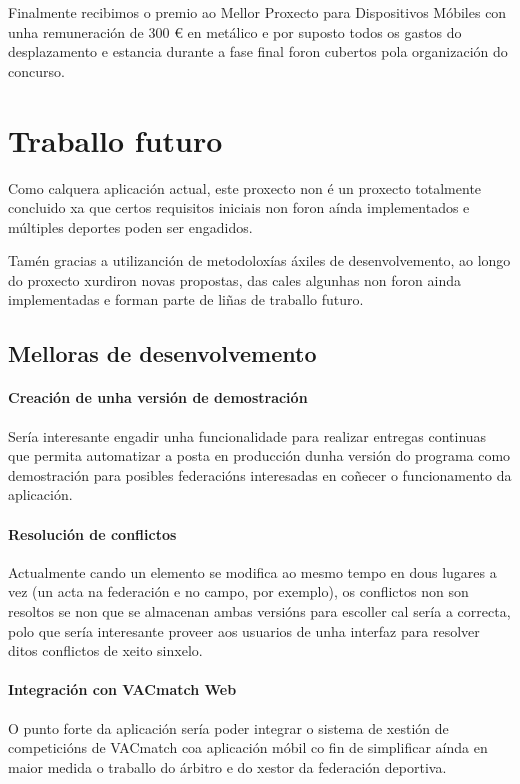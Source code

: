  Finalmente recibimos o premio ao Mellor Proxecto para Dispositivos Móbiles 
con unha remuneración de 300 \euro{} en metálico e por suposto todos os gastos 
do desplazamento e estancia durante a fase final foron cubertos pola 
organización do concurso.

\section{Traballo futuro}
Como calquera aplicación actual, este proxecto non é un proxecto totalmente 
concluido xa que certos requisitos iniciais non foron aínda implementados e 
múltiples deportes poden ser engadidos.

Tamén gracias a utilizanción de metodoloxías áxiles de desenvolvemento, ao 
longo do proxecto xurdiron novas propostas, das cales algunhas non foron 
ainda implementadas e forman parte de liñas de traballo futuro.

  \subsection{Melloras de desenvolvemento}

    \paragraph{Creación de unha versión de demostración} Sería interesante 
engadir unha funcionalidade para realizar entregas continuas que permita 
automatizar a posta en producción dunha versión do programa como demostración 
para posibles federacións interesadas en coñecer o funcionamento da aplicación.

    \paragraph{Resolución de conflictos} Actualmente cando un elemento se 
modifica ao mesmo tempo en dous lugares a vez (un acta na federación e no 
campo, por exemplo), os conflictos non son resoltos se non que se almacenan 
ambas versións para escoller cal sería a correcta, polo que sería interesante 
proveer aos usuarios de unha interfaz para resolver ditos conflictos de xeito 
sinxelo.

    \paragraph{Integración con VACmatch Web} O punto forte da aplicación sería 
poder integrar o sistema de xestión de competicións de VACmatch coa aplicación 
móbil co fin de simplificar aínda en maior medida o traballo do árbitro e do 
xestor da federación deportiva. 

